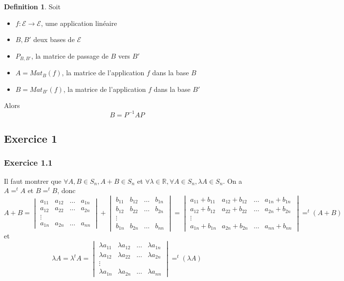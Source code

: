 \documentclass[]{book}
\theoremstyle{definition}
\newtheorem{defn}{Definition}
\newcommand{\bb}[1]{\mathbb{#1}}
\newcommand{\R}{\bb{R}}
\newcommand{\E}{\mathscr{E}}
\begin{document}
\begin{defn}
Soit 
\begin{itemize}
\item $f: \E \to \E$, ume application lin\'eaire
\item $B,B'$ deux bases de $\E$
\item $P_{B,B'}$, la matrice de passage de $B$ vers $B'$
\item $A=Mat_{B}(f)$, la matrice de l'application $f$ dans la base $B$
\item $B=Mat_{B'}(f)$, la matrice de l'application $f$ dans la base $B'$
\end{itemize}
Alors $$B = P^{-1}AP$$
\end{defn}



\newpage
\subsection*{Exercice 1}
\subsubsection*{Exercice 1.1}
Il faut montrer que $\forall A, B \in S_n, A + B \in S_n$ et $\forall \lambda \in \R, \forall A \in S_n, \lambda A \in S_n$. On a $A = ^{t}A$ et $B = ^{t}B$, donc
$$
A + B = \begin{vmatrix} a_{11} & a_{12} & \ldots & a_{1n} \\ a_{12} & a_{22} & \ldots & a_{2n} \\ \vdots & & & \\ a_{1n} & a_{2n} & \ldots & a_{nn} \end{vmatrix} +
\begin{vmatrix} b_{11} & b_{12} & \ldots & b_{1n} \\ b_{12} & b_{22} & \ldots & b_{2n} \\ \vdots & & & \\ b_{1n} & b_{2n} & \ldots & b_{nn} \end{vmatrix} =
\begin{vmatrix} a_{11} + b_{11} & a_{12} + b_{12} & \ldots & a_{1n} + b_{1n} \\ a_{12} + b_{12} & a_{22} + b_{22} & \ldots & a_{2n} + b_{2n} \\ \vdots & & & \\ a_{1n} + b_{1n}& a_{2n} + b_{2n}& \ldots & a_{nn} + b_{nn} \end{vmatrix}
= ^{t}(A+B)
$$ 
et
$$
\lambda A = \lambda ^{t}A = \begin{vmatrix} \lambda a_{11} & \lambda a_{12} & \ldots & \lambda a_{1n} \\ \lambda a_{12} & \lambda a_{22} & \ldots & \lambda a_{2n} \\ \vdots & & & \\ \lambda a_{1n} & \lambda a_{2n} & \ldots & \lambda a_{nn} \end{vmatrix} = ^{t}(\lambda A)
$$
\end{document}
